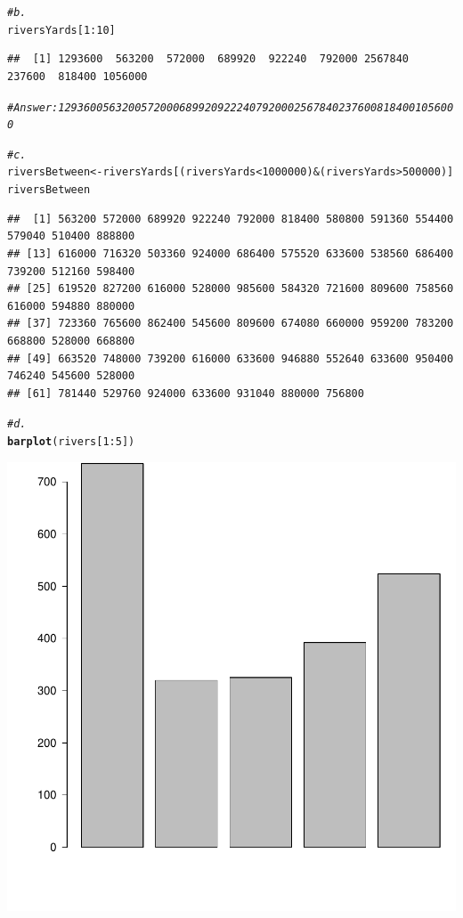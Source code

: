 \documentclass{article}\usepackage[]{graphicx}\usepackage[]{xcolor}
\makeatletter
\newcommand{\hlnum}[1]{\textcolor[rgb]{0.686,0.059,0.569}{#1}}%
\newcommand{\hlcom}[1]{\textcolor[rgb]{0.678,0.584,0.686}{\textit{#1}}}%
\newcommand{\hlopt}[1]{\textcolor[rgb]{0,0,0}{#1}}%
\newcommand{\hlstd}[1]{\textcolor[rgb]{0.345,0.345,0.345}{#1}}%
\newcommand{\hlkwb}[1]{\textcolor[rgb]{0.69,0.353,0.396}{#1}}%
\newcommand{\hlkwd}[1]{\textcolor[rgb]{0.737,0.353,0.396}{\textbf{#1}}}%
\newenvironment{kframe}{%
 \def\at@end@of@kframe{}%
 \ifinner\ifhmode%
  \def\at@end@of@kframe{\end{minipage}}%
  \begin{minipage}{\columnwidth}%
 \fi\fi%
 \def\FrameCommand##1{\hskip\@totalleftmargin \hskip-\fboxsep
 \colorbox{shadecolor}{##1}\hskip-\fboxsep
     \hskip-\linewidth \hskip-\@totalleftmargin \hskip\columnwidth}%
 \MakeFramed {\advance\hsize-\width
   \@totalleftmargin\z@ \linewidth\hsize
   \@setminipage}}%
 {\par\unskip\endMakeFramed%
 \at@end@of@kframe}
\newenvironment{knitrout}{}{} %
\makeatother
\begin{document}
\begin{knitrout}
\begin{kframe}
\begin{alltt}
\hlcom{#b.}
\hlstd{riversYards[}\hlnum{1}\hlopt{:}\hlnum{10}\hlstd{]}
\end{alltt}
\begin{verbatim}
##  [1] 1293600  563200  572000  689920  922240  792000 2567840  237600  818400 1056000
\end{verbatim}
\begin{alltt}
\hlcom{#Answer: 1293600  563200  572000  689920  922240  792000 2567840  237600  818400 1056000}

\hlcom{#c.}
\hlstd{riversBetween} \hlkwb{<-} \hlstd{riversYards[(riversYards}\hlopt{<}\hlnum{1000000}\hlstd{)} \hlopt{&} \hlstd{(riversYards}\hlopt{>}\hlnum{500000}\hlstd{)]}
\hlstd{riversBetween}
\end{alltt}
\begin{verbatim}
##  [1] 563200 572000 689920 922240 792000 818400 580800 591360 554400 579040 510400 888800
## [13] 616000 716320 503360 924000 686400 575520 633600 538560 686400 739200 512160 598400
## [25] 619520 827200 616000 528000 985600 584320 721600 809600 758560 616000 594880 880000
## [37] 723360 765600 862400 545600 809600 674080 660000 959200 783200 668800 528000 668800
## [49] 663520 748000 739200 616000 633600 946880 552640 633600 950400 746240 545600 528000
## [61] 781440 529760 924000 633600 931040 880000 756800
\end{verbatim}
\begin{alltt}
\hlcom{#d.}
\hlkwd{barplot}\hlstd{(rivers[}\hlnum{1}\hlopt{:}\hlnum{5}\hlstd{])}
\end{alltt}
\end{kframe}

{\centering \includegraphics[width=.6\linewidth]{figure/Meng51940633A1-Rnwauto-report-1} 

}



\end{knitrout}
\end{document}
